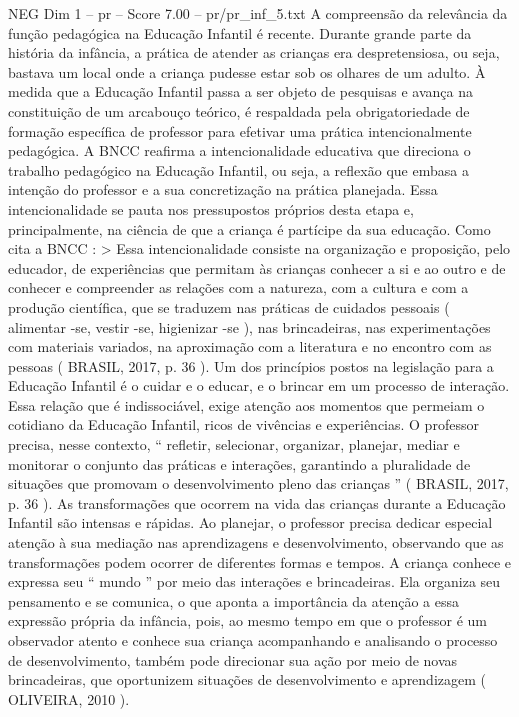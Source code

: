 \begin{textsample}{NEG Dim 1 – pr – Score 7.00 – pr/pr\_inf\_5.txt}  \label{ex:f1_neg_266}
A compreensão da relevância da função pedagógica na Educação Infantil é recente.
Durante grande parte da história da infância, a prática de atender as crianças era despretensiosa, ou seja, bastava um local onde a criança pudesse estar sob os olhares de um adulto.
À medida que a Educação Infantil passa a ser objeto de pesquisas e avança na constituição de um arcabouço teórico, é respaldada pela obrigatoriedade de formação específica de professor para efetivar uma prática intencionalmente pedagógica.
A BNCC reafirma a intencionalidade educativa que direciona o trabalho pedagógico na Educação Infantil, ou seja, a reflexão que embasa a intenção do professor e a sua concretização na prática planejada.
Essa intencionalidade se pauta nos pressupostos próprios desta etapa e, principalmente, na ciência de que a criança é partícipe da sua educação.
Como cita a BNCC : > Essa intencionalidade consiste na organização e proposição, pelo educador, de experiências que permitam às crianças conhecer a si e ao outro e de conhecer e compreender as relações com a natureza, com a cultura e com a produção científica, que se traduzem nas práticas de cuidados pessoais ( alimentar -se, vestir -se, higienizar -se ), nas brincadeiras, nas experimentações com materiais variados, na aproximação com a literatura e no encontro com as pessoas ( BRASIL, 2017, p. 36 ).
Um dos princípios postos na legislação para a Educação Infantil é o cuidar e o educar, e o brincar em um processo de interação.
Essa relação que é indissociável, exige atenção aos momentos que permeiam o cotidiano da Educação Infantil, ricos de vivências e experiências.
O professor precisa, nesse contexto, “ refletir, selecionar, organizar, planejar, mediar e monitorar o conjunto das práticas e interações, garantindo a pluralidade de situações que promovam o desenvolvimento pleno das crianças ” ( BRASIL, 2017, p. 36 ).
As transformações que ocorrem na vida das crianças durante a Educação Infantil são intensas e rápidas.
Ao planejar, o professor precisa dedicar especial atenção à sua mediação nas aprendizagens e desenvolvimento, observando que as transformações podem ocorrer de diferentes formas e tempos.
A criança conhece e expressa seu “ mundo ” por meio das interações e brincadeiras.
Ela organiza seu pensamento e se comunica, o que aponta a importância da atenção a essa expressão própria da infância, pois, ao mesmo tempo em que o professor é um observador atento e conhece sua criança acompanhando e analisando o processo de desenvolvimento, também pode direcionar sua ação por meio de novas brincadeiras, que oportunizem situações de desenvolvimento e aprendizagem ( OLIVEIRA, 2010 ).

\end{textsample}
